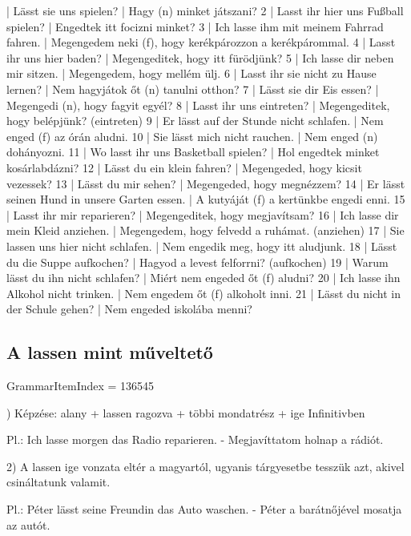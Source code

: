 \documentclass{article}
\newenvironment{desc}{\verbatim}{\endverbatim}
\newenvironment{exmp}{\verbatim}{\endverbatim}
\begin{document}
\begin{exmp}
1 | Lässt sie uns spielen? | Hagy (n) minket játszani?
2 | Lasst ihr hier uns Fußball spielen? | Engedtek itt focizni minket?
3 | Ich lasse ihm mit meinem Fahrrad fahren. | Megengedem neki (f), hogy kerékpározzon a kerékpárommal.
4 | Lasst ihr uns hier baden? | Megengeditek, hogy itt fürödjünk?
5 | Ich lasse dir neben mir sitzen. | Megengedem, hogy mellém ülj.
6 | Lasst ihr sie nicht zu Hause lernen? | Nem hagyjátok őt (n) tanulni otthon?
7 | Lässt sie dir Eis essen? | Megengedi (n), hogy fagyit egyél?
8 | Lasst ihr uns eintreten? | Megengeditek, hogy belépjünk? (eintreten)
9 | Er lässt auf der Stunde nicht schlafen. | Nem enged (f) az órán aludni.
10 | Sie lässt mich nicht rauchen. | Nem enged (n) dohányozni.
11 | Wo lasst ihr uns Basketball spielen? | Hol engedtek minket kosárlabdázni?
12 | Lässt du ein klein fahren? | Megengeded, hogy kicsit vezessek?
13 | Lässt du mir sehen? | Megengeded, hogy megnézzem?
14 | Er lässt seinen Hund in unsere Garten essen. | A kutyáját (f) a kertünkbe engedi enni.
15 | Lasst ihr mir reparieren? | Megengeditek, hogy megjavítsam?
16 | Ich lasse dir mein Kleid anziehen. | Megengedem, hogy felvedd a ruhámat. (anziehen)
17 | Sie lassen uns hier nicht schlafen. | Nem engedik meg, hogy itt aludjunk.
18 | Lässt du die Suppe aufkochen? | Hagyod a levest felforrni? (aufkochen)
19 | Warum lässt du ihn nicht schlafen? | Miért nem engeded őt (f) aludni?
20 | Ich lasse ihn Alkohol nicht trinken. | Nem engedem őt (f) alkoholt inni.
21 | Lässt du nicht in der Schule gehen? | Nem engeded iskolába menni?
\end{exmp}

\subsection{A lassen mint műveltető}

GrammarItemIndex = 136545

\begin{desc}
1) Képzése: alany + lassen ragozva + többi mondatrész + ige Infinitivben 

Pl.: Ich lasse morgen das Radio reparieren. - Megjavíttatom holnap a rádiót.

2) A lassen ige vonzata eltér a magyartól, ugyanis tárgyesetbe tesszük
azt, akivel csináltatunk valamit.

Pl.: Péter lässt seine Freundin das Auto waschen. - Péter a barátnőjével mosatja az autót.
\end{desc}
\end{document}
